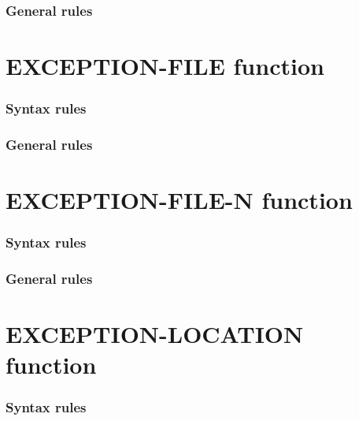 \subsubsection{General rules}

\section{EXCEPTION-FILE function}

\begin{syntax}
   
\end{syntax}

\subsubsection{Syntax rules}

\subsubsection{General rules}

\section{EXCEPTION-FILE-N function}

\begin{syntax}
\end{syntax}

\subsubsection{Syntax rules}

\subsubsection{General rules}

\section{EXCEPTION-LOCATION function}

\begin{syntax}
   
\end{syntax}

\subsubsection{Syntax rules}

